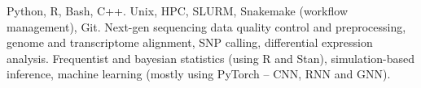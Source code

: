 {}
{Python, R, Bash, C++.}{}
{}
{Unix, HPC, SLURM, Snakemake (workflow management), Git.}{}
{}
{Next-gen sequencing data quality control and preprocessing, genome and transcriptome alignment, SNP calling, differential expression analysis.}{}
{}
{Frequentist and bayesian statistics (using R and Stan), simulation-based inference, machine learning (mostly using PyTorch -- CNN, RNN and GNN).}{}
